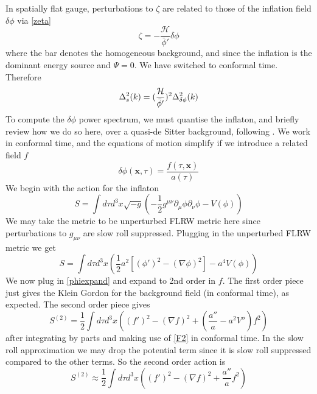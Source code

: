 \documentclass[a4paper,10pt]{article}
\renewcommand{\v}[1]{\mathbf{#1}}
\newcommand{\half}{\frac{1}{2}}
\newcommand{\bphi}{\bar{\phi}}
\begin{document}
In spatially flat gauge, perturbations to $\zeta$ are related to those of the inflation field $\delta\phi$ via \ref{zeta}
\begin{equation}
\zeta = -\frac{\mathcal{H}}{\bphi'}\delta\phi
\end{equation}
where the bar denotes the homogeneous background, and since the inflation is the dominant energy source and $\Psi = 0$. We have switched to conformal time. Therefore
\begin{equation}
\Delta^2_{s}(k) =(\frac{\mathcal{H}}{\bphi'})^2\Delta^2_{\delta\phi}(k)\\
\end{equation}
To compute the $\delta\phi$ power spectrum, we must quantise the inflaton, and briefly review how we do so here, over a quasi-de Sitter background, following \cite{baumann}. We work in conformal time, and the equations of motion simplify if we introduce a related field $f$ 
\begin{equation}
\delta\phi(\v{x},\tau) = \frac{f(\tau, \v{x})}{a(\tau)}
\label{phiexpand}
\end{equation}
We begin with the action for the inflaton
\begin{equation}
S =  \int d\tau d^3x \sqrt{-g} \left(-\half g^{\mu \nu}\partial_\mu \phi\partial_\nu \phi - V(\phi)\right)
\end{equation}
We may take the metric to be unperturbed FLRW metric here since perturbations to $g_{\mu\nu}$ are slow roll suppressed. Plugging in the unperturbed FLRW metric we get 
\begin{equation}
S = \int d\tau d^3x \left(\half a^2 [(\phi ' )^2 -(\nabla \phi)^2]-a^4V(\phi)\right)
\label{scalarfieldaction}
\end{equation}
We now plug in \ref{phiexpand} and expand to 2nd order in $f$. The first order piece just gives the Klein Gordon for the background field (in conformal time), as expected. The second order piece gives
\begin{equation}
S^{(2)} = \half \int d\tau d^3x \left((f')^2 - (\nabla f)^2 + (\frac{a''}{a}-a^2V'')f^2\right)
\end{equation}
after integrating by parts and making use of \ref{F2} in conformal time. In the slow roll approximation we may drop the potential term since it is slow roll suppressed compared to the other terms. So the second order action is 
\begin{equation}
S^{(2)} \approx \half \int d\tau d^3x \left((f')^2 - (\nabla f)^2 + \frac{a''}{a}f^2\right)
\end{equation}
\end{document}
